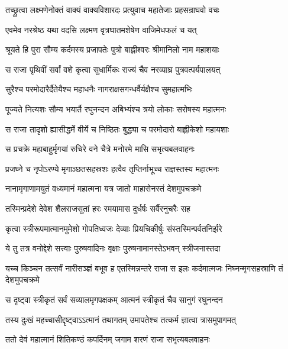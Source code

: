 
\twolineshloka
{तच्छ्रुत्वा लक्ष्मणेनोक्तं वाक्यं वाक्यविशारदः}
{प्रत्युवाच महातेजाः प्रहसन्राघवो वचः} %

\twolineshloka
{एवमेव नरश्रेष्ठ यथा वदसि लक्ष्मण}
{वृत्रघातमशेषेण वाजिमेधफलं च यत्} %

\twolineshloka
{श्रूयते हि पुरा सौम्य कर्दमस्य प्रजापतेः}
{पुत्रो बाह्लीश्वरः श्रीमानिलो नाम महाशयाः} %

\twolineshloka
{स राजा पृथिवीं सर्वां वशे कृत्वा सुधार्मिकः}
{राज्यं चैव नरव्याघ्र पुत्रवत्पर्यपालयत्} %

\twolineshloka
{सुरैश्च परमोदारैर्दैतेयैश्च महाधनैः}
{नागराक्षसगन्धर्वैर्यक्षैश्च सुमहात्मभिः} %

\twolineshloka
{पूज्यते नित्यशः सौम्य भयार्तै रघुनन्दन}
{अबिभ्यंश्च त्रयो लोकाः सरोषस्य महात्मनः} %

\twolineshloka
{स राजा तादृशो ह्यासीद्धर्मे वीर्ये च निष्ठितः}
{बुद्ध्या च परमोदारो बाह्लीकेशो महायशाः} %

\twolineshloka
{स प्रचक्रे महाबाहुर्मृगयां रुचिरे वने}
{चैत्रे मनोरमे मासि सभृत्यबलवाहनः} %

\twolineshloka
{प्रजघ्ने च नृपोऽरण्ये मृगाञ्छतसहस्रशः}
{हत्वैव तृप्तिर्नाभूच्च राज्ञस्तस्य महात्मनः} %

\twolineshloka
{नानामृगाणामयुतं वध्यमानं महात्मना}
{यत्र जातो माहासेनस्तं देशमुपचक्रमे} %

\twolineshloka
{तस्मिन्प्रदेशे देवेश शैलराजसुतां हरः}
{रमयामास दुर्धर्षः सर्वैरनुचरैः सह} %

\twolineshloka
{कृत्वा स्त्रीरूपमात्मानमुमेशो गोपतिध्वजः}
{देव्याः प्रियचिकीर्षुः संस्तस्मिन्पर्वतनिर्झरे} %

\twolineshloka
{ये तु तत्र वनोद्देशे सत्त्वाः पुरुषवादिनः}
{वृक्षाः पुरुषनामानस्तेऽभवन् स्त्रीजनास्तदा} %

\threelineshloka
{यच्च किञ्चन तत्सर्वं नारीसञ्ज्ञं बभूव ह}
{एतस्मिन्नन्तरे राजा स इलः कर्दमात्मजः}
{निघ्नन्मृगसहस्राणि तं देशमुपचक्रमे} %

\twolineshloka
{स दृष्ट्वा स्त्रीकृतं सर्वं सव्यालमृगपक्षकम्}
{आत्मनं स्त्रीकृतं चैव सानुगं रघुनन्दन} %

\twolineshloka
{तस्य दुःखं महच्चासीद्दृष्ट्वाऽऽत्मानं तथागतम्}
{उमापतेश्च तत्कर्म ज्ञात्वा त्रासमुपागमत्} %

\twolineshloka
{ततो देवं महात्मानं शितिकण्ठं कपर्दिनम्}
{जगाम शरणं राजा सभृत्यबलवाहनः} %

